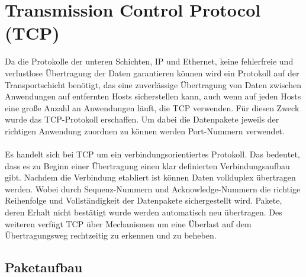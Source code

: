\FloatBarrier
\section{Transmission Control Protocol (TCP)}
Da die Protokolle der unteren Schichten, IP und Ethernet, keine fehlerfreie und verlustlose Übertragung der Daten garantieren können wird ein Protokoll auf der Transportschicht benötigt, das eine zuverlässige Übertragung von Daten zwischen Anwendungen auf entfernten Hosts sicherstellen kann, auch wenn auf jeden Hosts eine große Anzahl an Anwendungen läuft, die TCP verwenden. Für diesen Zweck wurde das TCP-Protokoll erschaffen. Um dabei die Datenpakete jeweils der richtigen Anwendung zuordnen zu können werden Port-Nummern verwendet. \\\\
Es handelt sich bei TCP um ein verbindungsorientiertes Protokoll. Das bedeutet, dass es zu Beginn einer Übertragung einen klar definierten Verbindungsaufbau gibt. Nachdem die Verbindung etabliert ist können Daten vollduplex übertragen werden. Wobei durch Sequenz-Nummern und Acknowledge-Nummern die richtige Reihenfolge und Vollständigkeit der Datenpakete sichergestellt wird. Pakete, deren Erhalt nicht bestätigt wurde werden automatisch neu übertragen. Des weiteren verfügt TCP über Mechanismen um eine Überlast auf dem Übertragungsweg rechtzeitig zu erkennen und zu beheben.  

\subsection{Paketaufbau}


